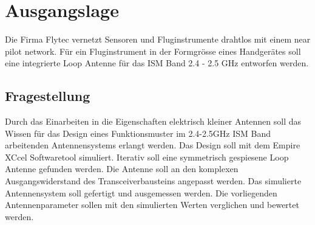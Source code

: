 \section{Ausgangslage}
Die Firma Flytec vernetzt Sensoren und Fluginstrumente drahtlos mit einem \glqq near pilot network\grqq{}. Für ein Fluginstrument in der Formgrösse eines Handgerätes soll eine integrierte Loop Antenne für das ISM Band 2.4 - 2.5 GHz entworfen werden.

\subsection{Fragestellung}
Durch das Einarbeiten in die Eigenschaften elektrisch kleiner Antennen soll das Wissen für das Design eines Funktionsmuster  im 2.4-2.5GHz ISM Band arbeitenden Antennensystems erlangt werden. Das Design soll mit dem Empire XCcel Softwaretool simuliert. Iterativ soll eine symmetrisch gespiesene Loop Antenne gefunden werden. Die Antenne soll an den komplexen Ausgangswiderstand des Transceiverbausteins angepasst werden. Das simulierte Antennensystem soll gefertigt und ausgemessen werden. Die vorliegenden Antennenparameter sollen mit den simulierten Werten verglichen und bewertet werden.  
